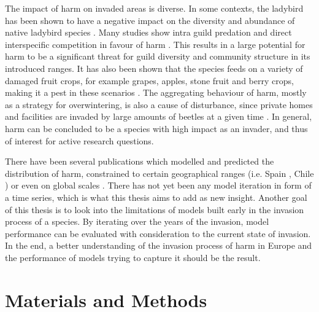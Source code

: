 \documentclass[12pt,a4paper]{article}
\begin{document}
The impact of \gls{harm} on invaded areas is diverse.
In some contexts, the ladybird has been shown to have a negative impact on the diversity and abundance of native ladybird species \autocite{roy2016harmonia}.
Many studies show intra guild predation and direct interspecific competition in favour of \gls{harm} \autocite{pell2008harmoniaIGP}.
This results in a large potential for \gls{harm} to be a significant threat for guild diversity and community structure in its introduced ranges.
It has also been shown that the species feeds on a variety of damaged fruit crops, for example grapes, apples, stone fruit and berry crops, making it a pest in these scenarios \autocite{koch2004harmoniafoodcrop}.
The aggregating behaviour of \gls{harm}, mostly as a strategy for overwintering, is also a cause of disturbance, since private homes and facilities are invaded by large amounts of beetles at a given time \autocite{nalepa2005harmoniahomes}.
In general, \gls{harm} can be concluded to be a species with high impact as an invader, and thus of interest for active research questions.

There have been several publications which modelled and predicted the distribution of \gls{harm}, constrained to certain geographical ranges (i.e. Spain \autocite{ameixa2019harmSDMSpain}, Chile \autocite{alaniz2018harmSDMChile}) or even on global scales \autocite{bidinger2012harmSDMglobalMaxent, poutsma2008harmSDMglobalClimex}.
There has not yet been any model iteration in form of a time series, which is what this thesis aims to add as new insight.
Another goal of this thesis is to look into the limitations of models built early in the invasion process of a species.
By iterating over the years of the invasion, model performance can be evaluated with consideration to the current state of invasion.
In the end, a better understanding of the invasion process of \gls{harm} in Europe and the performance of models trying to capture it should be the result.



\newpage
\section{Materials and Methods} \label{sec:materialsandmethods}
\end{document}
